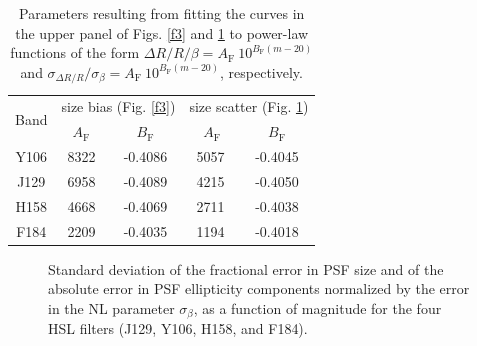 \documentclass[preprint]{aastex}
\begin{document}
\begin{table}
\centering
\begin{tabular}{|c|c|c|c|c|}
\hline
\multirow{2}{*}{Band} & \multicolumn{2}{c|}{size bias (Fig. \ref{f3})} & \multicolumn{2}{c|}{size scatter (Fig. \ref{f5})} \\
\cline{2-5}
& $A_{\text{F}}$ & $B_{\text{F}}$ & $\ A_{\text{F}}$ & $B_{\text{F}}$  \\
\hline
Y106 & 8322 & -0.4086 & 5057 &  -0.4045  \\
\hline
J129 & 6958 & -0.4089  & 4215 &  -0.4050 \\
\hline
H158 & 4668 & -0.4069 & 2711 &  -0.4038 \\
\hline
F184 & 2209 & -0.4035 & 1194 &  -0.4018 \\
\hline
\end{tabular}
\caption{Parameters resulting from fitting the curves in the upper panel of Figs. \ref{f3} and \ref{f5} to power-law functions of the form $\Delta R/ R/ \beta = A_{\text{F}}\ 10^{B_{\text{F}} (m - 20)}$ and $\sigma_{\Delta R/ R}/ \sigma_{\beta} = A_{\text{F}}\ 10^{B_{\text{F}} (m - 20)}$, respectively.}
\label{table2}
\end{table}

\begin{figure}[!h]
\centering
{}
\caption{Standard deviation of the fractional error in PSF size and of the absolute error in PSF ellipticity components normalized by the error in the NL parameter $\sigma_\beta$, as a function of magnitude for the four HSL filters (J129, Y106, H158, and F184).}
\label{f5}
\end{figure}
\end{document}
